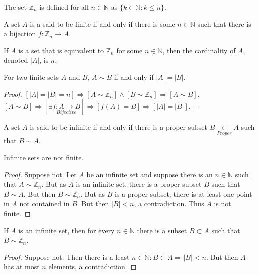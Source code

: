 \documentclass[crop=false,class=article,oneside]{standalone}
\begin{document}
        \begin{definition}
        The set $\mathbb{Z}_n$ is defined for all $n\in \mathbb{N}$ as $\{k\in \mathbb{N}: k\leq n\}$.
        \end{definition}
        \begin{definition}
        A set $A$ is a said to be finite if and only if there is some $n\in \mathbb{N}$ such that there is a bijection $f:\mathbb{Z}_n \rightarrow A$.
        \end{definition}
        \begin{definition}
        If $A$ is a set that is equivalent to $\mathbb{Z}_n$ for some $n\in \mathbb{N}$, then the cardinality of $A$, denoted $|A|$, is $n$.
        \end{definition}
        \begin{theorem}
        For two finite sets $A$ and $B$, $A\sim B$ if and only if $|A|=|B|$.
        \end{theorem}
        \begin{proof}
        $[|A|=|B|=n]\Rightarrow[A\sim \mathbb{Z}_n]\land[B\sim \mathbb{Z}_n]\Rightarrow [A\sim B]$. $[A\sim B]\Rightarrow [\exists \underset{Bijective}{f:A\rightarrow B}]\Rightarrow [f(A) = B]\Rightarrow [|A|=|B|]$.
        \end{proof}
        \begin{definition}
        A set $A$ is said to be infinite if and only if there is a proper subset $B\underset{Proper}\subset A$ such that $B\sim A$.
        \end{definition}
        \begin{theorem}
        Infinite sets are not finite.
        \end{theorem}
        \begin{proof}
        Suppose not. Let $A$ be an infinite set and suppose there is an $n\in \mathbb{N}$ such that $A\sim \mathbb{Z}_n$. But as $A$ is an infinite set, there is a proper subset $B$ such that $B\sim A$. But then $B\sim \mathbb{Z}_n$. But as $B$ is a proper subset, there is at least one point in $A$ not contained in $B$. But then $|B|<n$, a contradiction. Thus $A$ is not finite.
        \end{proof}
        \begin{corollary}
        If $A$ is an infinite set, then for every $n\in \mathbb{N}$ there is a subset $B\subset A$ such that $B\sim \mathbb{Z}_n$.
        \end{corollary}
        \begin{proof}
        Suppose not. Then there is a least $n\in \mathbb{N}:B\subset A\Rightarrow |B|<n$. But then $A$ has at most $n$ elements, a contradiction.
        \end{proof}
\end{document}
